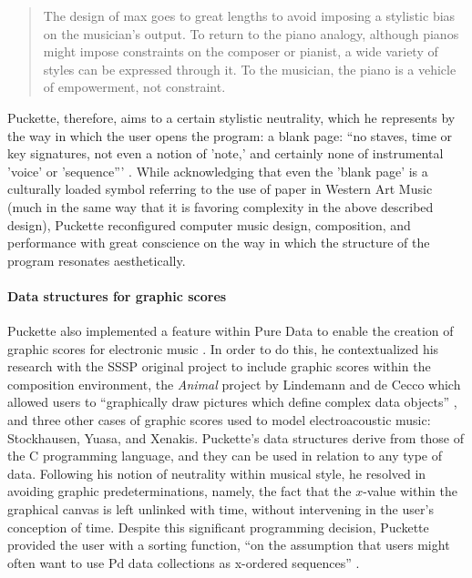 	\begin{quote}
		The design of \gls{max} goes to great lengths to avoid imposing a stylistic bias on the musician's output. To return to the piano analogy, although pianos might impose constraints on the composer or pianist, a wide variety of styles can be expressed through it. To the musician, the piano is a vehicle of empowerment, not constraint. \parencite{DBLP:journals/comj/Puckette02}
	\end{quote}

	Puckette, therefore, aims to a certain stylistic neutrality, which he represents by the way in which the user opens the program: a blank page: ``no staves, time or key signatures, not even a notion of 'note,' and certainly none of instrumental 'voice' or 'sequence''' \parencite{DBLP:journals/comj/Puckette02}. While acknowledging that even the 'blank page' is a culturally loaded symbol referring to the use of paper in Western Art Music (much in the same way that it is favoring complexity in the above described design), Puckette reconfigured computer music design, composition, and performance with great conscience on the way in which the structure of the program resonates aesthetically.

	\paragraph{Data structures for graphic scores}
	\label{computer:datastructures}

	Puckette also implemented a feature within Pure Data to enable the creation of graphic scores for electronic music \parencite{DBLP:conf/icmc/Puckette02}. In order to do this, he contextualized his research with the SSSP original project to include graphic scores within the composition environment, the \textit{Animal} project by Lindemann and de Cecco which allowed users to ``graphically draw pictures which define complex data objects'' \parencite{DBLP:conf/icmc/Lindemann90a}, and three other cases of graphic scores used to model electroacoustic music: Stockhausen, Yuasa, and Xenakis. Puckette's data structures derive from those of the C programming language, and they can be used in relation to any type of data. Following his notion of neutrality within musical style, he resolved in avoiding graphic predeterminations, namely, the fact that the $x$-value within the graphical canvas is left unlinked with time, without intervening in the user's conception of time. Despite this significant programming decision, Puckette provided the user with a sorting function, ``on the assumption that users might often want to use Pd data collections as x-ordered sequences'' \parencite{DBLP:conf/icmc/Puckette02}.

